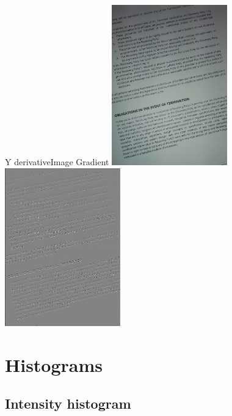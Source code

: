 \documentclass{beamer}
\begin{document}
\begin{frame}{Y derivative}{Image Gradient}
\centering    
   \includegraphics[width=50mm]{./Image1.jpg}\includegraphics[width=50mm]{./sobely.png}

\end{frame}

\section{Histograms}
\subsection{Intensity histogram}
\end{document}
